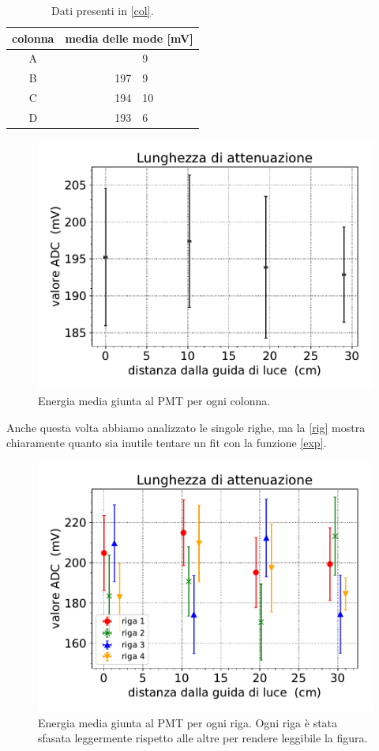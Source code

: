 \begin{table}[h]
\centering
\begin{tabular}{| c | r @{$\,\pm\,$} l |}
\hline
colonna & \multicolumn{2}{c|}{media delle mode [mV]} \\
\hline
A & \qquad \quad 195&9 \\
B & 197&9 \\
C & 194&10 \\
D & 193&6 \\
\hline
\end{tabular}
\caption{Dati presenti in \autoref{col}.}
\label{tab:ADC}
\end {table}

\begin{figure}[h]
\centering
\includegraphics[width=8 cm]{ecol}
\caption{Energia media giunta al PMT per ogni colonna.}
\label{col}
\end{figure}


Anche questa volta abbiamo analizzato le singole righe, ma la \autoref{rig} mostra chiaramente quanto sia inutile tentare un fit con la funzione \eqref{exp}. 

\begin{figure}[h]
\centering
\includegraphics[width=8 cm]{erig}
\caption{Energia media giunta al PMT per ogni riga.
Ogni riga è stata sfasata leggermente rispetto alle altre per rendere leggibile la figura.}
\label{rig}
\end{figure}



